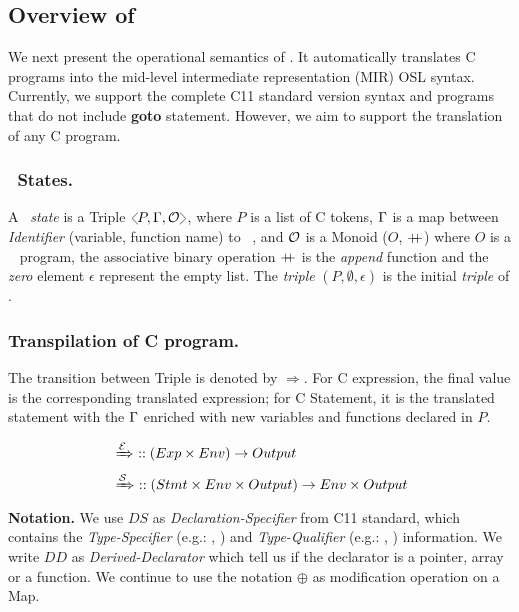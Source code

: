 \subsection{Overview of \oslt}
\label{ssec:overview-oslt}

We next present the operational semantics of \oslt. It automatically translates C programs into the mid-level intermediate representation (MIR) OSL syntax.
Currently, we support the complete  C11  standard version syntax and programs that do not include \textbf{goto} statement. However, we aim to support the translation of any C program.


\subsubsection{\oslt~States.} A \oslt~\textit{state} is a Triple $\cfg{P , \map, \out }$, where $P$ is a list of C tokens,
$\Gamma$ is a map between \textit{Identifier} (variable, function name) to \oslos~, and $\mathcal{O}$ is a Monoid ($O$, $\mathbin{{+}\mspace{-8mu}{+}}$) where $O$ is a \oslos~ program, the associative binary operation $\mathbin{{+}\mspace{-8mu}{+}}$ is the \textit{append} function and the \textit{zero} element $\epsilon$ represent the empty list.
The \textit{triple} $(P, \emptyset, \epsilon)$ is the initial \textit{triple} of \oslt.


\subsubsection{Transpilation of C program.}  The transition between Triple is denoted by $\Rightarrow$. For C expression, the final value is the corresponding translated expression; for C Statement, it is the translated statement with the $\Gamma$ enriched with new variables and functions declared in $P$.

\begin{align*}
&\xRightarrow[]{\mathcal{E}} ~::  ( Exp \times Env ) \rightarrow Output \\
&\xRightarrow[]{\mathcal{S}} ~::  ( Stmt \times Env \times Output ) \rightarrow Env \times Output \\
\end{align*}
\noindent\textbf{Notation.} We use $DS$ as \textit{Declaration-Specifier} from C11 \cite{ISOC11} standard, which contains the \textit{Type-Specifier} (e.g.: , ) and \textit{Type-Qualifier} (e.g.: , ) information. We write $DD$ as \textit{Derived-Declarator} which tell us if the declarator is a pointer, array or a function. We continue to use the notation $\oplus$ as modification operation on a Map.\\

